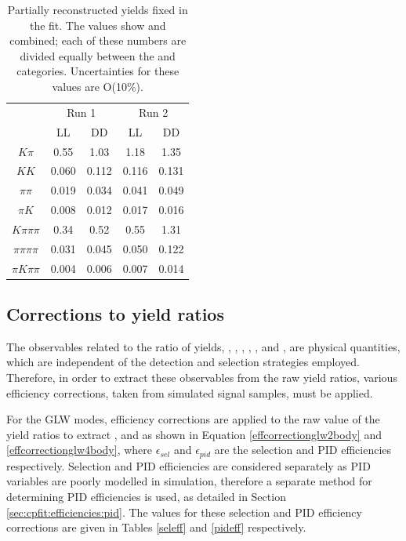 \begin{table}[h]
\centering
\begin{tabular}{c|cc|cc}
\hline
& \multicolumn{2}{c}{Run 1} & \multicolumn{2}{c}{Run 2} \\
& LL & DD & LL & DD \\
\hline
$K\pi$ & 0.55 & 1.03 & 1.18 & 1.35 \\
$KK$ & 0.060 & 0.112 & 0.116 & 0.131 \\
$\pi\pi$ & 0.019 & 0.034 & 0.041 & 0.049 \\
$\pi K$ & 0.008 & 0.012 & 0.017 & 0.016 \\
$K\pi\pi\pi$ & 0.34 & 0.52 & 0.55 & 1.31 \\
$\pi\pi\pi\pi$ & 0.031 & 0.045 & 0.050 & 0.122  \\
$\pi K\pi\pi$ & 0.004 & 0.006 & 0.007 & 0.014 \\
\hline
\end{tabular}
\caption{Partially reconstructed yields fixed in the \CP fit. The values show \Bp and \Bm combined; each of these numbers are divided equally between the \Bp and \Bm categories. Uncertainties for these values are O(10\%).}
\label{partrecofixedyields}
\end{table}

\subsection{Corrections to yield ratios}
\label{sec:cpfit:efficiencies}

The \CP observables related to the ratio of yields, \Rkk, \Rpipi, \Rptwo, \Rmtwo, \Rpipipipi, \Rpfour and \Rmfour, are physical quantities, which are independent of the detection and selection strategies employed. Therefore, in order to extract these \CP observables from the raw yield ratios, various efficiency corrections, taken from simulated signal samples, must be applied.

For the GLW modes, efficiency corrections are applied to the raw value of the yield ratios to extract \Rkk, \Rpipi and \Rpipipipi as shown in Equation \ref{effcorrectionglw2body} and \ref{effcorrectionglw4body}, where $\epsilon_{sel}$ and $\epsilon_{pid}$ are the selection and PID efficiencies respectively. Selection and PID efficiencies are considered separately as PID variables are poorly modelled in \lhcb simulation, therefore a separate method for determining PID efficiencies is used, as detailed in Section \ref{sec:cpfit:efficiencies:pid}. The values for these selection and PID efficiency corrections are given in Tables \ref{seleff} and \ref{pideff} respectively.

